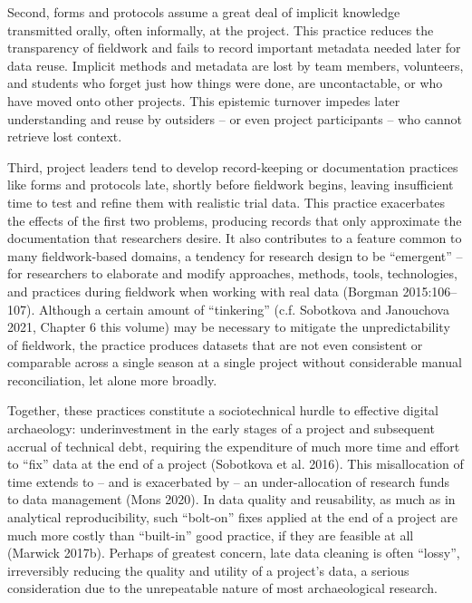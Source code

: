 \documentclass[article]{sa}
\begin{document}
Second, forms and protocols assume a great deal of implicit knowledge
transmitted orally, often informally, at the project. This practice
reduces the transparency of fieldwork and fails to record important
metadata needed later for data reuse. Implicit methods and metadata are
lost by team members, volunteers, and students who forget just how
things were done, are uncontactable, or who have moved onto other
projects. This epistemic turnover impedes later understanding and reuse
by outsiders -- or even project participants -- who cannot retrieve lost
context.

Third, project leaders tend to develop record-keeping or documentation
practices like forms and protocols late, shortly before fieldwork
begins, leaving insufficient time to test and refine them with realistic
trial data. This practice exacerbates the effects of the first two
problems, producing records that only approximate the documentation that
researchers desire. It also contributes to a feature common to many
fieldwork-based domains, a tendency for research design to be ``emergent''
-- for researchers to elaborate and modify approaches, methods, tools,
technologies, and practices during fieldwork when working with real data
(Borgman 2015:106--107). Although a certain amount of ``tinkering''
(c.f. Sobotkova and Janouchova 2021, Chapter 6 this volume) may be
necessary to mitigate the unpredictability of fieldwork, the practice
produces datasets that are not even consistent or comparable across a
single season at a single project without considerable manual
reconciliation, let alone more broadly.

Together, these practices constitute a sociotechnical hurdle to
effective digital archaeology: underinvestment in the early stages of a
project and subsequent accrual of technical debt, requiring the
expenditure of much more time and effort to ``fix'' data at the end of a
project (Sobotkova et al. 2016). This misallocation of time extends to
-- and is exacerbated by -- an under-allocation of research funds to
data management (Mons 2020). In data quality and reusability, as much as
in analytical reproducibility, such ``bolt-on'' fixes applied at the end
of a project are much more costly than ``built-in'' good
practice, if they are feasible at all (Marwick 2017b). Perhaps of
greatest concern, late data cleaning is often ``lossy'', irreversibly
reducing the quality and utility of a project's data, a serious
consideration due to the unrepeatable nature of most archaeological
research.
\end{document}

